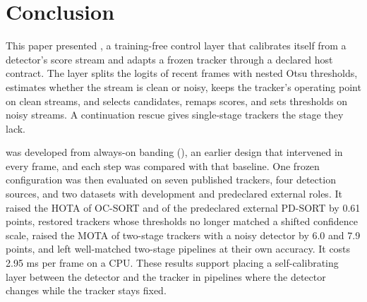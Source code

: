 \section{Conclusion}\label{sec:conclusion}

This paper presented \scl{}, a training-free control layer that calibrates itself
from a detector's score stream and adapts a frozen tracker through a declared
host contract. The layer splits the logits of recent frames with nested Otsu
thresholds, estimates whether the stream is clean or noisy, keeps the
tracker's operating point on clean streams, and selects candidates, remaps
scores, and sets thresholds on noisy streams. A continuation rescue gives
single-stage trackers the stage they lack.

\scl{} was developed from always-on banding (\aob{}), an earlier design that
intervened in every frame, and each step was compared with that baseline.
One frozen configuration was then evaluated on seven published trackers, four
detection sources, and two datasets with development and predeclared
external roles. It raised the HOTA of
OC-SORT and of the predeclared external PD-SORT by 0.61 points, restored
trackers whose thresholds no longer matched a shifted confidence scale, raised
the MOTA of two-stage trackers with a noisy detector by 6.0 and 7.9 points,
and left well-matched two-stage pipelines at their own accuracy. It costs
2.95 ms per frame on a CPU. These results support placing a self-calibrating
layer between the detector and the tracker in pipelines where the detector
changes while the tracker stays fixed.
